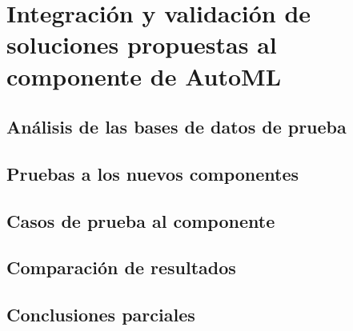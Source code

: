 \chapter{Integración y validación de soluciones propuestas al componente de AutoML}\label{chap:3}

\section{Análisis de las bases de datos de prueba}

\section{Pruebas a los nuevos componentes}

\section{Casos de prueba al componente}

\section{Comparación de resultados}

\section{Conclusiones parciales}

\pagebreak
